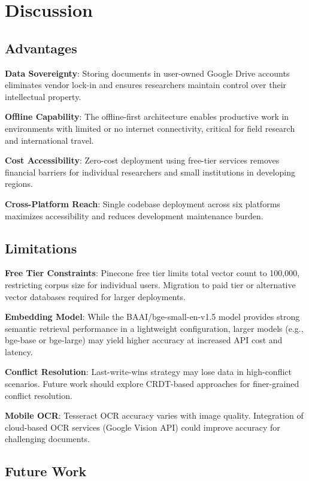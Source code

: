\documentclass[conference]{IEEEtran}
\begin{document}
\section{Discussion}

\subsection{Advantages}

\textbf{Data Sovereignty}: Storing documents in user-owned Google Drive accounts eliminates vendor lock-in and ensures researchers maintain control over their intellectual property.

\textbf{Offline Capability}: The offline-first architecture enables productive work in environments with limited or no internet connectivity, critical for field research and international travel.

\textbf{Cost Accessibility}: Zero-cost deployment using free-tier services removes financial barriers for individual researchers and small institutions in developing regions.

\textbf{Cross-Platform Reach}: Single codebase deployment across six platforms maximizes accessibility and reduces development maintenance burden.

\subsection{Limitations}

\textbf{Free Tier Constraints}: Pinecone free tier limits total vector count to 100,000, restricting corpus size for individual users. Migration to paid tier or alternative vector databases required for larger deployments.

\textbf{Embedding Model}: While the BAAI/bge-small-en-v1.5 model provides strong semantic retrieval performance in a lightweight configuration, larger models (e.g., bge-base or bge-large) may yield higher accuracy at increased API cost and latency.


\textbf{Conflict Resolution}: Last-write-wins strategy may lose data in high-conflict scenarios. Future work should explore CRDT-based approaches for finer-grained conflict resolution.

\textbf{Mobile OCR}: Tesseract OCR accuracy varies with image quality. Integration of cloud-based OCR services (Google Vision API) could improve accuracy for challenging documents.

\subsection{Future Work}
\end{document}
